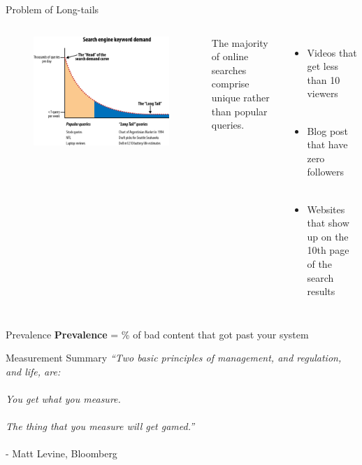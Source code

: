 \documentclass[nobackground,dvipsnames,table]{beamer}
\begin{document}
\begin{frame}{Problem of Long-tails}
    \begin{columns}
            \begin{figure}
                \centering
                \includegraphics[width=\textwidth]{long-tail}
            \end{figure}
            The majority of online searches comprise unique rather than popular queries. \\~\\
            \begin{itemize}
                \item Videos that get less than 10 viewers \\~\\
                \item Blog post that have zero followers \\~\\
                \item Websites that show up on the 10th page of the search results
            \end{itemize}
    \end{columns}
\end{frame}

\begin{frame}{Prevalence}
    \textbf{Prevalence} = \% of bad content that got past your system 
\end{frame}

\begin{frame}{Measurement Summary}
    \centering
    \textit{“Two basic principles of management, and regulation, and life, are:} \\~\\
    
    \textit{You get what you measure.} \\~\\
    
    \textit{The thing that you measure will get gamed.”} \\~\\
          - Matt Levine, Bloomberg 
\end{frame}
\end{document}
